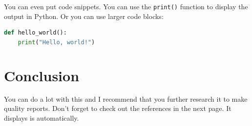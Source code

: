 \documentclass[12pt]{article}
\begin{document}
You can even put code snippets. You can use the \lstinline|print()| function to display the output in Python. Or you can use larger code blocks:
\begin{lstlisting}[language=Python, caption=Sample Python Code, label=lst:sample_python]
def hello_world():
    print("Hello, world!")
\end{lstlisting}

\section{Conclusion}
You can do a lot with this and I recommend that you further research it to make quality reports. Don't forget to check out the references in the next page. It displays is automatically.


\newpage
% 


\end{document}
